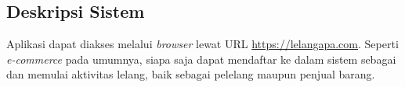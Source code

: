 \subsection{Deskripsi Sistem}
Aplikasi dapat diakses melalui \textit{browser} lewat URL {\url{https://lelangapa.com}}. Seperti \textit{e-commerce} pada umumnya, siapa saja dapat mendaftar ke dalam sistem sebagai dan memulai aktivitas lelang, baik sebagai pelelang maupun penjual barang.
